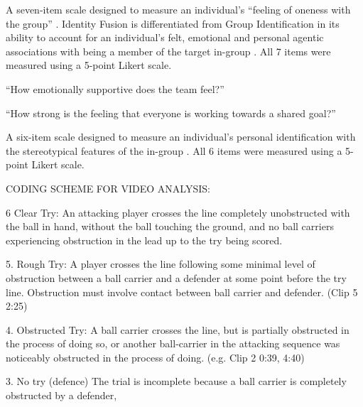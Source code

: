 \item [Identity Fusion Verbal] A seven-item scale designed to measure an individual's ``feeling of oneness with the group'' \citep{Swann2009}.  Identity Fusion is differentiated from Group Identification in its ability to account for an individual's felt, emotional and personal agentic associations with being a member of the target in-group \citep{Swann2012a}.  All 7 items were measured using a 5-point Likert scale.


\item [Emotional Support] ``How emotionally supportive does the team feel?''
\item [Shared Goal] ``How strong is the feeling that everyone is working towards a shared goal?''

\item [Group Identification Verbal] A six-item scale designed to measure an individual's personal identification with the stereotypical features of the in-group  \citep{Mael1992}.  All 6 items were measured using a 5-point Likert scale.






CODING SCHEME FOR VIDEO ANALYSIS:

6 Clear Try: An attacking player crosses the line completely unobstructed with the ball in hand, without the ball touching the ground, and no ball carriers experiencing obstruction in the lead up to the try being scored.

5. Rough Try: A player crosses the line following some minimal level of obstruction between a ball carrier and a defender at some point before the try line. Obstruction must involve contact between ball carrier and defender.  (Clip 5 2:25)

4.	Obstructed Try: A ball carrier crosses the line, but is partially obstructed in the process of doing so, or another ball-carrier in the attacking sequence was noticeably obstructed in the process of doing. (e.g. Clip 2 0:39, 4:40)

3. No try (defence)	The trial is incomplete because a ball carrier is completely obstructed by a defender,


